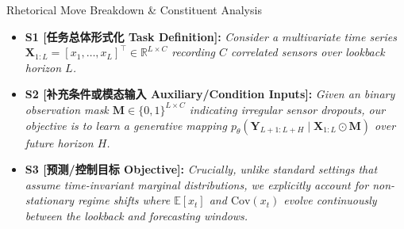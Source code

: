 \begin{TipBox}{Rhetorical Move Breakdown \& Constituent Analysis}
\begin{itemize}[leftmargin=1.5em]
  \item \textbf{S1 [任务总体形式化 Task Definition]:} \textit{Consider a multivariate time series $\mathbf{X}_{1:L} = [x_1, \dots, x_L]^\top \in \mathbb{R}^{L \times C}$ recording $C$ correlated sensors over lookback horizon $L$.}\par{}
  \item \textbf{S2 [补充条件或模态输入 Auxiliary/Condition Inputs]:} \textit{Given an binary observation mask $\mathbf{M} \in \{0, 1\}^{L \times C}$ indicating irregular sensor dropouts, our objective is to learn a generative mapping $p_\theta(\mathbf{Y}_{L+1:L+H} \mid \mathbf{X}_{1:L} \odot \mathbf{M})$ over future horizon $H$.}\par{}
  \item \textbf{S3 [预测/控制目标 Objective]:} \textit{Crucially, unlike standard settings that assume time-invariant marginal distributions, we explicitly account for non-stationary regime shifts where $\mathbb{E}[x_t]$ and $\text{Cov}(x_t)$ evolve continuously between the lookback and forecasting windows.}\par{}
\end{itemize}
\end{TipBox}
\medskip
